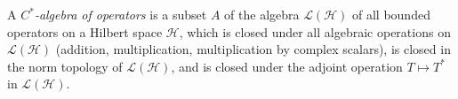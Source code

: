 A \emph{$C^*$-algebra of operators} is a subset $A$ of the algebra $\mathcal{L}(\mathcal{H})$ of all bounded operators on a Hilbert space $\mathcal{H}$, which is closed under all algebraic operations on $\mathcal{L}(\mathcal{H})$ (addition, multiplication, multiplication by complex scalars), is closed in the norm topology of $\mathcal{L}(\mathcal{H})$, and is closed under the adjoint operation $T \mapsto T^*$ in $\mathcal{L}(\mathcal{H})$.
